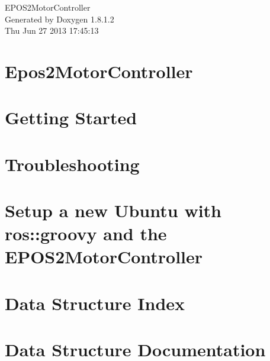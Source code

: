 \documentclass{book}
\begin{document}
\hypersetup{pageanchor=false,citecolor=blue}
\begin{titlepage}
\vspace*{7cm}
\begin{center}
{\Large E\-P\-O\-S2\-Motor\-Controller }\\
\vspace*{1cm}
{\large Generated by Doxygen 1.8.1.2}\\
\vspace*{0.5cm}
{\small Thu Jun 27 2013 17:45:13}\\
\end{center}
\end{titlepage}
\clearemptydoublepage
{}
\tableofcontents
\clearemptydoublepage
{}
\hypersetup{pageanchor=true,citecolor=blue}
\chapter{Epos2\-Motor\-Controller}
\label{index}\hypertarget{index}{}
\chapter{Getting Started}
\label{start}
\hypertarget{start}{}

\chapter{Troubleshooting}
\label{troubleshooting}
\hypertarget{troubleshooting}{}

\chapter{Setup a new Ubuntu with ros\-:\-:groovy and the E\-P\-O\-S2\-Motor\-Controller}
\label{setup}
\hypertarget{setup}{}

\chapter{Data Structure Index}

\chapter{Data Structure Documentation}




















\printindex
\end{document}
